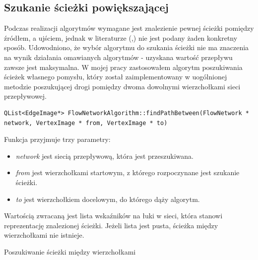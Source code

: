 \subsection{Szukanie ścieżki powiększającej}\label{ssec:szukanieSciezkiAlg}
Podczas realizacji algorytmów wymagane jest znalezienie pewnej ścieżki pomiędzy źródłem, a ujściem, jednak w literaturze (\cite{id:ZaawansowaneAlgorytmy},\cite{id:IntroductionToAlgorithms}) nie jest podany żaden konkretny sposób. Udowodniono, że wybór algorytmu do szukania ścieżki nie ma znaczenia na wynik działania omawianych algorytmów - uzyskana wartość przepływu zawsze jest maksymalna. W mojej pracy zastosowałem algorytm poszukiwania ścieżek własnego pomysłu, który został zaimplementowany w uogólnionej metodzie poszukującej drogi pomiędzy dwoma dowolnymi wierzchołkami sieci przepływowej.
\begin{verbatim}
QList<EdgeImage*> FlowNetworkAlgorithm::findPathBetween(FlowNetwork * network, VertexImage * from, VertexImage * to)
\end{verbatim}
Funkcja przyjmuje trzy parametry:
\begin{itemize}
	\item \emph{network} jest siecią przepływową, która jest przeszukiwana.
	\item \emph{from} jest wierzchołkami startowym, z którego rozpoczynane jest szukanie ścieżki.
	\item \emph{to} jest wierzchołkiem docelowym, do którego dąży algorytm.
\end{itemize}
Wartością zwracaną jest lista wskaźników na łuki w sieci, która stanowi reprezentację znalezionej ścieżki. Jeżeli lista jest pusta, ścieżka między wierzchołkami nie istnieje.
\begin{algorithm}[H]
	\caption{Poszukiwanie ścieżki między wierzchołkami}\label{poszukiwanieSciezkiMiedzyWierzcholkami}
	\begin{algorithmic}
					\EndIf
				\EndFor
					\Else
						\Else
						\EndIf
					\EndIf
				\EndIf
				\EndIf
			\EndWhile\space
		\EndProcedure
	\end{algorithmic}
\end{algorithm}
